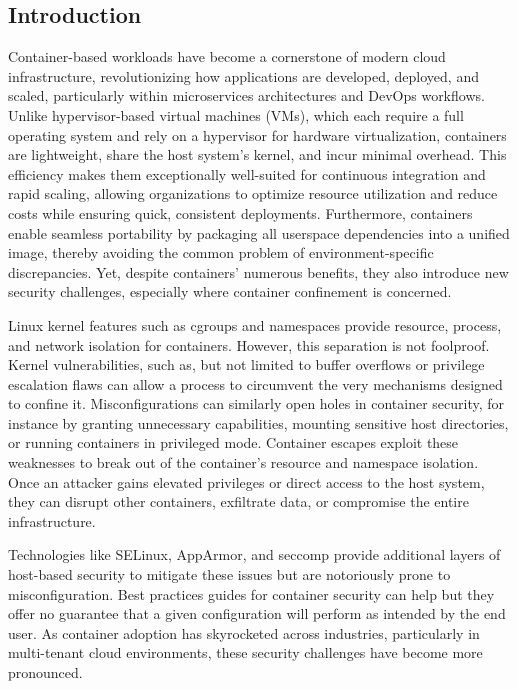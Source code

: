 \documentclass[12pt]{report}
\begin{document}
\begin{doublespace}
\chapter{Introduction}

Container-based workloads have become a cornerstone of modern cloud infrastructure, revolutionizing how applications are developed, deployed, and scaled, particularly within microservices architectures and DevOps workflows. Unlike hypervisor-based virtual machines (VMs), which each require a full operating system and rely on a hypervisor for hardware virtualization, containers are lightweight, share the host system’s kernel, and incur minimal overhead. This efficiency makes them exceptionally well-suited for continuous integration and rapid scaling, allowing organizations to optimize resource utilization and reduce costs while ensuring quick, consistent deployments. Furthermore, containers enable seamless portability by packaging all userspace dependencies into a unified image, thereby avoiding the common problem of environment-specific discrepancies. Yet, despite containers’ numerous benefits, they also introduce new security challenges, especially where container confinement is concerned.

Linux kernel features such as cgroups and namespaces provide resource, process, and network isolation for containers. However, this separation is not foolproof. Kernel vulnerabilities, such as, but not limited to buffer overflows or privilege escalation flaws can allow a process to circumvent the very mechanisms designed to confine it. Misconfigurations can similarly open holes in container security, for instance by granting unnecessary capabilities, mounting sensitive host directories, or running containers in privileged mode. Container escapes exploit these weaknesses to break out of the container’s resource and namespace isolation. Once an attacker gains elevated privileges or direct access to the host system, they can disrupt other containers, exfiltrate data, or compromise the entire infrastructure. 

Technologies like SELinux, AppArmor, and seccomp provide additional layers of host-based security to mitigate these issues but are notoriously prone to misconfiguration. Best practices guides for container security \cite{CIS} can help but they offer no guarantee that a given configuration will perform as intended by the end user. As container adoption has skyrocketed across industries, particularly in multi-tenant cloud environments, these security challenges have become more pronounced.


\end{doublespace}
\end{document}
